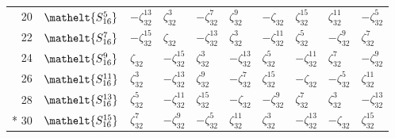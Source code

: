 \documentclass[10pt,a4paper]{article}
\numberwithin{equation}{section}
\newcommand{\eltfont}[1]{{\let\sigma\eltsigma\mathelt{#1}}}
\newcommand{\cls}[1]{\eltfont{#1}}
\newcommand{\rootunity}[1]{\zeta_{#1}}
\begin{document}
{\begin{longtable}{@{}rlllllllll@{}}
20 & $\cls{S_{16}^{5}}$ & $-\rootunity{32}^{13}$ & $\rootunity{32}^{3}$ & $-\rootunity{32}^{7}$ & $\rootunity{32}^{9}$ & $-\rootunity{32}$ & $\rootunity{32}^{15}$ & $\rootunity{32}^{11}$ & $-\rootunity{32}^{5}$\\
22 & $\cls{S_{16}^{7}}$ & $-\rootunity{32}^{15}$ & $\rootunity{32}$ & $-\rootunity{32}^{13}$ & $\rootunity{32}^{3}$ & $-\rootunity{32}^{11}$ & $\rootunity{32}^{5}$ & $-\rootunity{32}^{9}$ & $\rootunity{32}^{7}$\\
24 & $\cls{S_{16}^{9}}$ & $\rootunity{32}$ & $-\rootunity{32}^{15}$ & $\rootunity{32}^{3}$ & $-\rootunity{32}^{13}$ & $\rootunity{32}^{5}$ & $-\rootunity{32}^{11}$ & $\rootunity{32}^{7}$ & $-\rootunity{32}^{9}$\\
26 & $\cls{S_{16}^{11}}$ & $\rootunity{32}^{3}$ & $-\rootunity{32}^{13}$ & $\rootunity{32}^{9}$ & $-\rootunity{32}^{7}$ & $\rootunity{32}^{15}$ & $-\rootunity{32}$ & $-\rootunity{32}^{5}$ & $\rootunity{32}^{11}$\\
28 & $\cls{S_{16}^{13}}$ & $\rootunity{32}^{5}$ & $-\rootunity{32}^{11}$ & $\rootunity{32}^{15}$ & $-\rootunity{32}$ & $-\rootunity{32}^{9}$ & $\rootunity{32}^{7}$ & $\rootunity{32}^{3}$ & $-\rootunity{32}^{13}$\\*
30 & $\cls{S_{16}^{15}}$ & $\rootunity{32}^{7}$ & $-\rootunity{32}^{9}$ & $-\rootunity{32}^{5}$ & $\rootunity{32}^{11}$ & $\rootunity{32}^{3}$ & $-\rootunity{32}^{13}$ & $-\rootunity{32}$ & $\rootunity{32}^{15}$\\
\bottomrule\end{longtable}}
\end{document}
